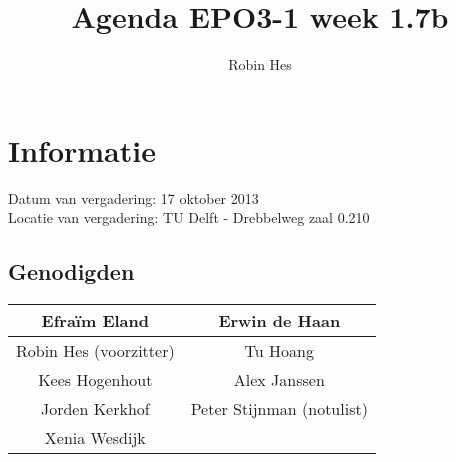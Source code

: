 \documentclass{article}
\begin{document}
\title{Agenda EPO3-1 week 1.7b}%
\author{Robin Hes}%
\maketitle

\section*{Informatie}
Datum van vergadering: 17 oktober 2013\\ %
Locatie van vergadering: TU Delft - Drebbelweg zaal 0.210 %
\subsection*{Genodigden}
\begin{center}
\begin{tabular}{|c |c |}
	\hline
	Efraïm Eland & Erwin de Haan \\
	\hline
	Robin Hes (voorzitter) & Tu Hoang \\
	\hline
	Kees Hogenhout & Alex Janssen \\
	\hline
	Jorden Kerkhof & Peter Stijnman (notulist) \\
	\hline
	Xenia Wesdijk & \\
	\hline
\end{tabular}
\end{center}
\end{document}
